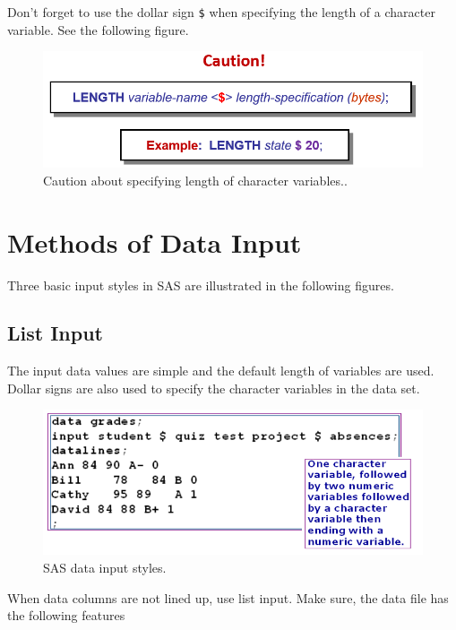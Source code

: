 \documentclass[
]{book}
\begin{document}
Don't forget to use the dollar sign \texttt{\$} when specifying the length of a character variable. See the following figure.

\begin{figure}

{\centering \includegraphics[width=0.6\linewidth]{img03/w03-SpecifyingLengthofChar} 

}

\caption{Caution about specifying length of character variables..}\label{fig:unnamed-chunk-14}
\end{figure}

\hypertarget{methods-of-data-input}{%
\section{Methods of Data Input}\label{methods-of-data-input}}

Three basic input styles in SAS are illustrated in the following figures.

\hypertarget{list-input}{%
\subsection{List Input}\label{list-input}}

The input data values are simple and the default length of variables are used. Dollar signs are also used to specify the character variables in the data set.

\begin{figure}

{\centering \includegraphics[width=0.6\linewidth]{img03/w03-LinrInput} 

}

\caption{SAS data input styles.}\label{fig:unnamed-chunk-15}
\end{figure}

When data columns are not lined up, use list input. Make sure, the data file has the following features
\end{document}
